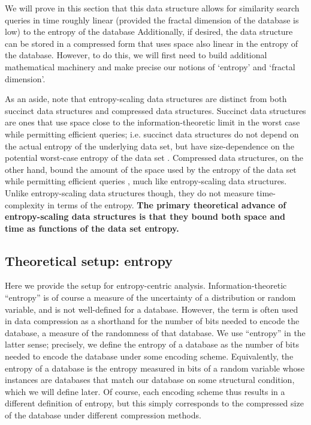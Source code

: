 \documentclass{amsbook}
\theoremstyle{definition}
\theoremstyle{remark}
\numberwithin{equation}{section}
\begin{document}
We will prove in this section that this data structure allows for similarity search queries in time roughly linear (provided the fractal dimension of the database is low) to the entropy of the database
Additionally, if desired, the data structure can be stored in a compressed form that uses space also linear in the entropy of the database.
However, to do this, we will first need to build additional mathematical machinery and make precise our notions of `entropy' and `fractal dimension'.

As an aside, note that entropy-scaling data structures are distinct from both succinct data structures and compressed data structures.
Succinct data structures are ones that use space close to the information-theoretic limit in the worst case while permitting efficient queries; i.e.
succinct data structures do not depend on the actual entropy of the underlying data set, but have size-dependence on the potential worst-case entropy of the data set \cite{jacobson1988succinct}.
Compressed data structures, on the other hand, bound the amount of the space used by the entropy of the data set while permitting efficient queries \cite{grossi2005compressed, ferragina2000opportunistic}, much like entropy-scaling data structures.
Unlike entropy-scaling data structures though, they do not measure time-complexity in terms of the entropy.
\textbf{The primary theoretical advance of entropy-scaling data structures is that they bound both space and time as functions of the data set entropy.}

\subsection{Theoretical setup: entropy}
Here we provide the setup for entropy-centric analysis.
Information-theoretic ``entropy'' is of course a measure of the uncertainty of a distribution or random variable, and is not well-defined for a database.
However, the term is often used in data compression as a shorthand for the number of bits needed to encode the database, a measure of the randomness of that database.
We use ``entropy'' in the latter sense; precisely, we define the entropy of a database as the number of bits needed to encode the database under some encoding scheme.
Equivalently, the entropy of a database is the entropy measured in bits of a random variable whose instances are databases that match our database on some structural condition, which we will define later.
Of course, each encoding scheme thus results in a different definition of entropy, but this simply corresponds to the compressed size of the database under different compression methods.
\end{document}
